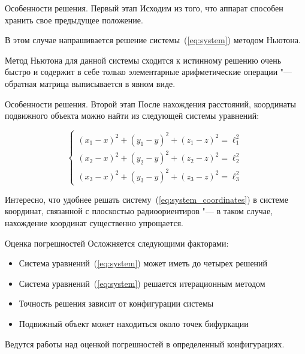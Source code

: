 \documentclass[russian,hyperref={unicode}]{beamer}
\begin{document}
  \begin{frame}{Особенности решения. Первый этап}
    Исходим из того, что аппарат способен хранить свое предыдущее положение.

    В этом случае напрашивается решение системы~(\ref{eq:system}) методом Ньютона.

    Метод Ньютона для данной системы сходится к истинному решению очень быстро и
    содержит в себе только элементарные арифметические операции "--- обратная матрица
    выписывается в явном виде.
  \end{frame}

  \begin{frame}{Особенности решения. Второй этап}
    После нахождения расстояний, координаты подвижного объекта можно найти из следующей
    системы уравнений:

    \begin{equation}\label{eq:system_coordinates}
      \begin{cases}
        \left(x_1 - x\right)^2 + \left(y_1 - y\right)^2 + \left(z_1 - z\right)^2 = \ell_1^2 \\
        \left(x_2 - x\right)^2 + \left(y_2 - y\right)^2 + \left(z_2 - z\right)^2 = \ell_2^2 \\
        \left(x_3 - x\right)^2 + \left(y_3 - y\right)^2 + \left(z_3 - z\right)^2 = \ell_3^2
      \end{cases}
    \end{equation}

    Интересно, что удобнее решать систему~(\ref{eq:system_coordinates}) в системе координат,
    связанной с плоскостью радиоориентиров "--- в таком случае, нахождение координат
    существенно упрощается.
  \end{frame}

  \begin{frame}{Оценка погрешностей}
    Осложняется следующими факторами:
    \begin{itemize}
      \item Система уравнений~(\ref{eq:system}) может иметь до четырех решений
      \item Система уравнений~(\ref{eq:system}) решается итерационным методом
      \item Точность решения зависит от конфигурации системы
      \item Подвижный объект может находиться около точек бифуркации
    \end{itemize}

    Ведутся работы над оценкой погрешностей в определенный конфигурациях.
  \end{frame}

  \frame{\titlepage}
\end{document}
